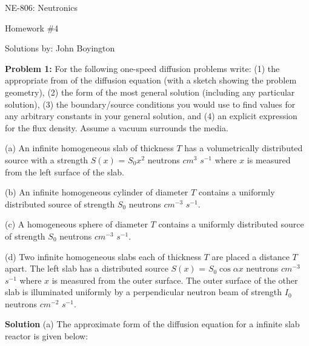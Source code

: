 \documentclass{amsart}
\theoremstyle{definition}
\begin{document}
\LARGE{NE-806: Neutronics}
 
\large
Homework \#4
 
Solutions by: John Boyington
\newline
\bigskip



\textbf{Problem 1:} \newline For the following one-speed diffusion problems write: (1) the appropriate from of the diffusion equation (with a sketch showing the problem geometry), (2) the form of the most general solution (including any particular solution), (3) the boundary/source conditions you would use to find values for any arbitrary constants in your general solution, and (4) an explicit expression for the flux density.
Assume a vacuum surrounds the media.
\bigbreak

(a) An infinite homogeneous slab of thickness $T$ has a volumetrically distributed source with a strength $S(x)$ = $S_0x^2$ neutrons $cm^3$ $s^{-1}$ where $x$ is measured from the left surface of the slab.\newline
\bigbreak

(b) An infinite homogeneous cylinder of diameter $T$ contains a uniformly distributed source of strength $S_0$ neutrons $cm^{-3}$ $s^{-1}$.\newline
\bigbreak

(c) A homogeneous sphere of diameter $T$ contains a uniformly distributed source of strength $S_0$ neutrons $cm^{-3}$ $s^{-1}$.\newline
\bigbreak

(d) Two infinite homogeneous slabs each of thickness $T$ are placed a distance $T$ apart.
The left slab has a distributed source $S(x)$ = $S_0\cos \alpha x$ neutrons $cm^{-3}$ $s^{-1}$ where $x$ is measured from the outer surface.
The outer surface of the other slab is illuminated uniformly by a perpendicular neutron beam of strength $I_0$ neutrons $cm^{-2}$ $s^{-1}$.\newline
\bigbreak

\textbf{Solution}
\bigbreak
(a) The approximate form of the diffusion equation for a infinite slab reactor is given below:
\bigbreak
\end{document}
